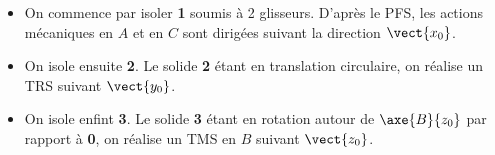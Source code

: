 \ifprof
\begin{itemize}
\item On commence par isoler \textbf{1} soumis à 2 glisseurs. D'après le PFS, les actions mécaniques en $A$ et en $C$ sont dirigées suivant la direction $\vect{x_0}$.
\item On isole ensuite \textbf{2}. Le solide \textbf{2} étant en translation circulaire, on réalise un TRS suivant $\vect{y_0}$. 
\item On isole enfint \textbf{3}. Le solide \textbf{3} étant en rotation autour de $\axe{B}{z_0}$ par rapport à \textbf{0},  on réalise un TMS en $B$ suivant $\vect{z_0}$. 
\end{itemize}
\else
\fi

\ifcolle
{}
\ifprof
\else
\fi
\else
\fi

\ifprof
\else
{}
\fi

